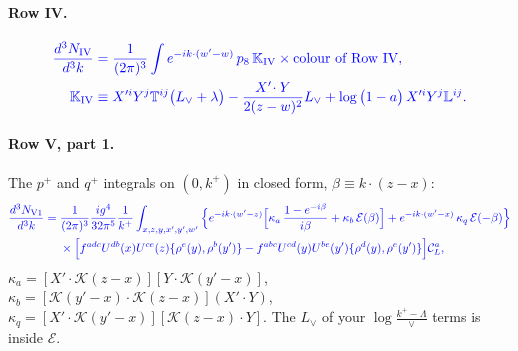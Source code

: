 \documentclass[10pt]{article}
\numberwithin{equation}{section}
\newcommand{\new}[1]{{\color{blue}#1}}
\newcommand{\Lv}{L_{\vee}}
\newcommand{\CL}{\mathcal C_L}
\newcommand{\KK}{\mathcal K}
\newcommand{\EE}{\mathcal E}
\newcommand{\pre}{\frac{1}{(2\pi)^3}}
\newcommand{\phw}{e^{-ik\cdot(w'-w)}}
\newcommand{\la}{\log\big(1-a\big)}
\begin{document}
\paragraph{Row IV.}
\begin{equation}
\new{\begin{aligned}\frac{d^3N_{\rm IV}}{d^3k}&=\pre\int\phw\,p_8\,\mathbb K_{\rm IV}\times\text{colour of Row IV},\\\mathbb K_{\rm IV}&\equiv X'^iY^j\mathbb T^{ij}\big(\Lv+\lambda\big)-\frac{X'\!\cdot Y}{2(z-w)^2}\Lv+\la\,X'^iY^j\mathbb L^{ij}.\end{aligned}}
\label{eq:IV}
\end{equation}

\paragraph{Row V, part 1.} The $p^+$ and $q^+$ integrals on $(0,k^+)$ in closed form, $\beta\equiv k\cdot(z-x)$:
\begin{equation}
\new{\begin{aligned}\frac{d^3N_{\rm V1}}{d^3k}={}&\pre\frac{ig^4}{32\pi^5}\frac{1}{k^+}\int_{x,z,y,x',y',w'}\Big\{e^{-ik\cdot(w'-z)}\Big[\kappa_a\,\frac{1-e^{-i\beta}}{i\beta}+\kappa_b\,\EE(\beta)\Big]+e^{-ik\cdot(w'-x)}\,\kappa_q\,\EE(-\beta)\Big\}\\
&\times\Big[f^{adc}U^{db}(x)U^{ce}(z)\{\rho^e(y),\rho^b(y')\}-f^{abc}U^{cd}(y)U^{be}(y')\{\rho^d(y),\rho^e(y')\}\Big]\CL^a,\end{aligned}}
\label{eq:V1}
\end{equation}
$\kappa_a=[X'\!\cdot\KK(z-x)][Y\!\cdot\KK(y'-x)]$, $\kappa_b=[\KK(y'-x)\cdot\KK(z-x)](X'\!\cdot Y)$, $\kappa_q=[X'\!\cdot\KK(y'-x)][\KK(z-x)\cdot Y]$. The $\Lv$ of your $\log\frac{k^+-\Lambda}{\vee}$ terms is inside $\EE$.
\end{document}
